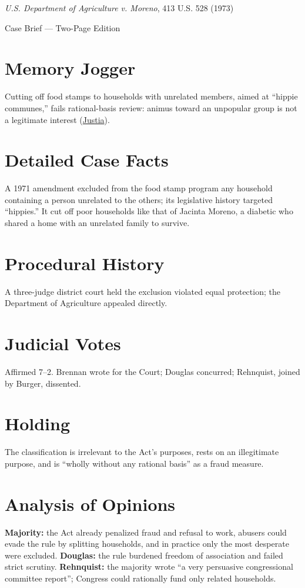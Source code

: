 \documentclass[12pt]{article}
\begin{document}
\begin{center}
{\LARGE \textit{U.S. Department of Agriculture v. Moreno}, 413 U.S. 528 (1973)\par}
\vspace{0.5em}
{\large Case Brief --- Two-Page Edition\par}
\end{center}

\section{Memory Jogger}
Cutting off food stamps to households with unrelated members, aimed at ``hippie communes,'' fails rational-basis review: animus toward an unpopular group is not a legitimate interest (\href{https://supreme.justia.com/cases/federal/us/413/528/}{Justia}).

\section{Detailed Case Facts}
A 1971 amendment excluded from the food stamp program any household containing a person unrelated to the others; its legislative history targeted ``hippies.'' It cut off poor households like that of Jacinta Moreno, a diabetic who shared a home with an unrelated family to survive.

\section{Procedural History}
A three-judge district court held the exclusion violated equal protection; the Department of Agriculture appealed directly.

\section{Judicial Votes}
Affirmed 7--2. Brennan wrote for the Court; Douglas concurred; Rehnquist, joined by Burger, dissented.

\section{Holding}
The classification is irrelevant to the Act's purposes, rests on an illegitimate purpose, and is ``wholly without any rational basis'' as a fraud measure.

\section{Analysis of Opinions}
\textbf{Majority:} the Act already penalized fraud and refusal to work, abusers could evade the rule by splitting households, and in practice only the most desperate were excluded. \textbf{Douglas:} the rule burdened freedom of association and failed strict scrutiny. \textbf{Rehnquist:} the majority wrote ``a very persuasive congressional committee report''; Congress could rationally fund only related households.
\end{document}
